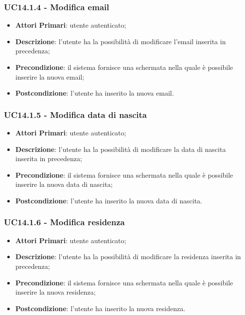 \subsubsection{UC14.1.4 - Modifica email}
\begin{itemize}
	\item \textbf{Attori Primari}: utente autenticato;
	\item \textbf{Descrizione}: l'utente ha la possibilità di modificare l'email inserita in precedenza;
	\item \textbf{Precondizione}: il sistema fornisce una schermata nella quale è possibile inserire la nuova email;
	\item \textbf{Postcondizione}: l'utente ha inserito la nuova email.
\end{itemize}

\subsubsection{UC14.1.5 - Modifica data di nascita}
\begin{itemize}
	\item \textbf{Attori Primari}: utente autenticato;
	\item \textbf{Descrizione}: l'utente ha la possibilità di modificare la data di nascita inserita in precedenza;
	\item \textbf{Precondizione}: il sistema fornisce una schermata nella quale è possibile inserire la nuova data di nascita;
	\item \textbf{Postcondizione}: l'utente ha inserito la nuova data di nascita.
\end{itemize}

\subsubsection{UC14.1.6 - Modifica residenza}
\begin{itemize}
	\item \textbf{Attori Primari}: utente autenticato;
	\item \textbf{Descrizione}: l'utente ha la possibilità di modificare la residenza inserita in precedenza;
	\item \textbf{Precondizione}: il sistema fornisce una schermata nella quale è possibile inserire la nuova residenza;
	\item \textbf{Postcondizione}: l'utente ha inserito la nuova residenza.
\end{itemize}

